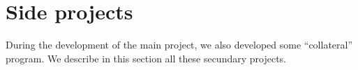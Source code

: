 \chapter{Side projects}\label{cap:SideProjects}
During the development of the main project, we also developed some ``collateral'' program.
We describe in this section all these secundary projects.



